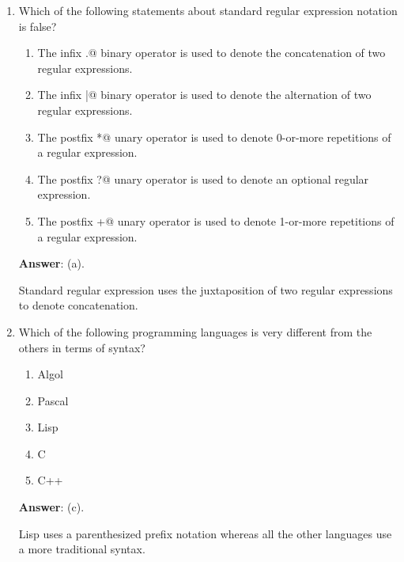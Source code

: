 \documentclass[12pt]{article}
\begin{document}
\begin{enumerate}

\item Which of the following statements about standard regular
  expression notation is false?

\begin{enumerate}

\item The infix \verb@.@ binary operator is used to denote the concatenation
  of two regular expressions.

\item The infix \verb@|@ binary operator is used to denote the alternation
  of two regular expressions.

\item The postfix \verb@*@ unary operator is used to denote 0-or-more
  repetitions of a regular expression.

\item The postfix \verb@?@ unary operator is used to denote an
optional regular expression.

\item The postfix \verb@+@ unary operator is used to denote 1-or-more
  repetitions of a regular expression.
    
\end{enumerate}

\textbf{Answer}: (a).

Standard regular expression uses the juxtaposition of two regular
expressions to denote concatenation. 

\item Which of the following programming languages is very different
  from the others in terms of syntax?
\begin{enumerate}

\item Algol

\item Pascal

\item Lisp

\item C

\item C++

\end{enumerate}

\textbf{Answer}: (c).

Lisp uses a parenthesized prefix notation whereas all the other
languages use a more traditional syntax.


\end{enumerate}
\end{document}
